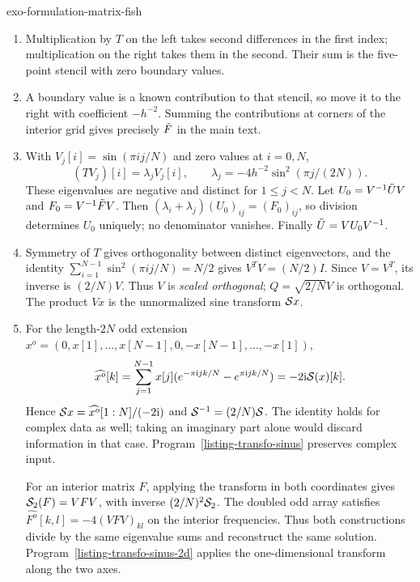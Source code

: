 \begin{correction}{exo-formulation-matrix-fish}
\begin{enumerate}
\item Multiplication by $T$ on the left takes second differences in the first
index; multiplication on the right takes them in the second. Their sum is
the five-point stencil with zero boundary values.
\item A boundary value is a known contribution to that stencil, so move it
to the right with coefficient $-h^{-2}$. Summing the contributions at corners
of the interior grid gives precisely $\tilde{F}$ in the main text.
\item With $V_j[i]=\sin(\pi ij/N)$ and zero values at $i=0,N$,
\[
 (TV_j)[i]=\lambda_jV_j[i],\qquad
 \lambda_j=-4h^{-2}\sin^2(\pi j/(2N)).
\]
These eigenvalues are negative and distinct for $1\leq j<N$.
Let $U_0=V^{-1}\tilde{U}V$ and $F_0=V^{-1}\tilde{F}V$. Then
$(\lambda_i+\lambda_j)(U_0)_{ij}=(F_0)_{ij}$, so division determines
$U_0$ uniquely; no denominator vanishes. Finally $\tilde{U}=VU_0V^{-1}$.
\item Symmetry of $T$ gives orthogonality between distinct eigenvectors,
and the identity $\sum_{i=1}^{N-1}\sin^2(\pi ij/N)=N/2$ gives
$V^TV=(N/2)I$. Since $V=V^T$, its inverse is $(2/N)V$.
Thus $V$ is \emph{scaled orthogonal}; $Q=\sqrt{2/N}V$ is orthogonal.
The product $Vx$ is the unnormalized sine transform $\mathcal{S} x$.
\item For the length-$2N$ odd extension
$x^o=(0,x[1],\ldots,x[N-1],0,-x[N-1],\ldots,-x[1])$,
\[
 \widehat{x^o}[k]
 =\sum_{j=1}^{N-1}x[j](e^{-\pi\mathrm{i} jk/N}-e^{\pi\mathrm{i} jk/N})
 =-2\mathrm{i}\mathcal{S}(x)[k].
\]
Hence $\mathcal{S} x=\widehat{x^o}[1:N]/(-2\mathrm{i})$ and
$\mathcal{S}^{-1}=(2/N)\mathcal{S}$. The identity holds for complex data as well; taking
an imaginary part alone would discard information in that case.
Program~\ref{listing-transfo-sinus} preserves complex input.
\begin{listing}[H]
\caption{The unnormalized sine transform, preserving complex data.}
\label{listing-transfo-sinus}
\end{listing}
For an interior matrix $F$, applying the transform in both coordinates gives
$\mathcal{S}_2(F)=VFV$, with inverse $(2/N)^2\mathcal{S}_2$.
The doubled odd array satisfies
$\widehat{F^o}[k,l]=-4(VFV)_{kl}$ on the interior frequencies.
Thus both constructions divide by the same eigenvalue sums and reconstruct
the same solution. Program~\ref{listing-transfo-sinus-2d} applies the
one-dimensional transform along the two axes.
\begin{listing}[H]
\caption{A two-dimensional sine transform.}
\label{listing-transfo-sinus-2d}
\end{listing}
\end{enumerate}
\end{correction}

